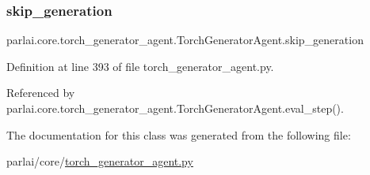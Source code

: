 \subsubsection{\texorpdfstring{skip\+\_\+generation}{skip\_generation}}
{\footnotesize\ttfamily parlai.\+core.\+torch\+\_\+generator\+\_\+agent.\+Torch\+Generator\+Agent.\+skip\+\_\+generation}



Definition at line 393 of file torch\+\_\+generator\+\_\+agent.\+py.



Referenced by parlai.\+core.\+torch\+\_\+generator\+\_\+agent.\+Torch\+Generator\+Agent.\+eval\+\_\+step().



The documentation for this class was generated from the following file\+:\begin{DoxyCompactItemize}
\item 
parlai/core/\hyperlink{torch__generator__agent_8py}{torch\+\_\+generator\+\_\+agent.\+py}\end{DoxyCompactItemize}
